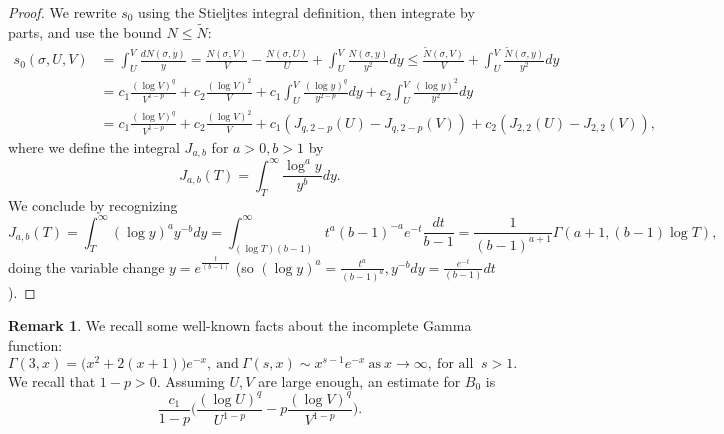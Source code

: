 \documentclass[10pt]{amsart}
\newcommand{\s}{\sigma}
\theoremstyle{definition}
\newtheorem{Rem}[prop]{Remark}
\numberwithin{equation}{section}
\begin{document}
\begin{proof}
We rewrite $s_0$ using the Stieljtes integral definition, then integrate by parts, and use the bound $N\le \tilde N$:
\begin{align*}
s_0(\s, U,V) &
= \int_{U}^{V} \frac{ dN(\sigma,y) }y 
 = \frac{N(\s,V)}V -  \frac{N(\s,U)}U + \int_{U}^{V}\frac{N(\s,y)}{y^2} dy
 \le  \frac{\tilde N(\s,V)}V + \int_{U}^{V}\frac{\tilde N(\s,y)}{y^2} dy 
\\& =  c_1  \frac{ (\log V )^{q }}{V^{1-p }} + c_2  \frac{(\log V)^2}{V}
+ c_1  \int_{U}^{V}  \frac{ (\log y )^{q } }{y^{2-p}} dy
+ c_2  \int_{U}^{V} \frac{(\log y)^2 }{ y^{2}} dy
\\& =  c_1  \frac{ (\log V )^{q }}{V^{1-p }} + c_2  \frac{(\log V)^2}{V}
+ c_1 \left(J_{q,2-p} (U)-J_{q,2-p} (V)\right)
+ c_2 \left( J_{2,2} (U)-J_{2,2} (V)\right),
\end{align*}
where we define the integral $J_{a,b}$ for $a>0,b>1$ by
\begin{equation}\label{def-Jab}
 J_{a,b}(T)=\int_{T}^{\infty} \frac{\log^a y}{y^b} dy.
\end{equation}
We conclude by recognizing 
\[
 J_{a,b}(T) 
  =  \int_{T}^{\infty} (\log y)^a  y^{-b} dy
  =  \int_{ (\log T)(b-1)}^{\infty}  t^a (b-1)^{-a}  e^{-t} \frac{dt}{b-1} 
=\frac{1}{(b-1)^{a+1} } \Gamma(a+1,(b-1)\log T),
\]
doing the variable change $y=e^{\frac{t}{(b-1)}}$
(so
$(\log y)^a = \frac{t^a}{(b-1)^a}, y^{-b} dy %
= \frac{e^{-t}}{(b-1)}dt$).
\end{proof}
%
\begin{Rem}
We recall some well-known facts about the incomplete Gamma function:
\begin{equation}\label{prop-Gamma}
\Gamma(3,x) = \Big(x^2+2(x+1)\Big)e^{-x} , \ \text{and}\ 
\Gamma(s,x) \sim x^{s-1} e^{-x} \ \text{as}\ x\to\infty, \ \text{for all }\ s>1.
\end{equation}
We recall that $1-p>0$. 
Assuming $U,V$ are large enough, an estimate for $B_0$ is
\[
\frac{c_1   }{ 1-p   } \Big( 
  \frac{(\log U)^{q }}{U^{ 1-p }} 
-   p     \frac{(\log V)^{q }}{V^{ 1-p }}
\Big) .
\]
\end{Rem}
\end{document}
